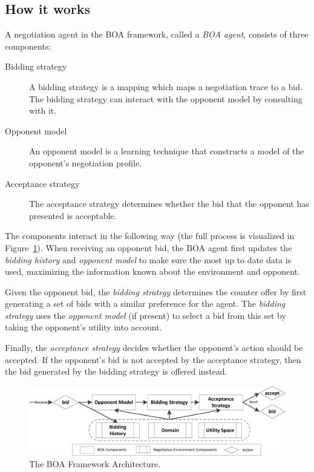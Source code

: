 \documentclass[]{article}
\begin{document}
\subsection{How it works}
A negotiation agent in the BOA framework, called a \textit{BOA agent}, consists of three components:
\begin{description}
  \item[Bidding strategy] A bidding strategy is a mapping which maps a negotiation trace to a bid. The bidding strategy can interact with the opponent model by consulting with it.%

  \item[Opponent model] An opponent model is a learning technique that constructs a model of the opponent's negotiation profile.%
  \item[Acceptance strategy] The acceptance strategy determines whether the bid that the opponent has presented is acceptable.
\end{description}
The components interact in the following way (the full process is visualized in Figure~\ref{fig:flowchart}). When receiving an opponent bid, the BOA agent first updates the \textit{bidding history} and \textit{opponent model} to make sure the most up to date data is used, maximizing the information known about the environment and opponent.

Given the opponent bid, the \textit{bidding strategy} determines the counter offer by first generating a set of bids with a similar preference for the agent. The \textit{bidding strategy} uses the \textit{opponent model} (if present) to select a bid from this set by taking the opponent's utility into account.

Finally, the \textit{acceptance strategy} decides whether the opponent's action should be accepted. If the opponent's bid is not accepted by the acceptance strategy, then the bid generated by the bidding strategy is offered instead.

\begin{figure}[t] 
	\center
	\includegraphics[width=14cm]{media/Decoupled_FlowChart.png}
	\caption{The BOA Framework Architecture.}
	\label{fig:flowchart}
\end{figure}
\end{document}
